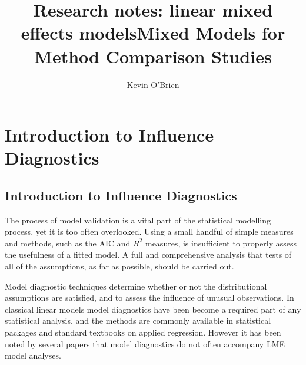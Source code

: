 \documentclass[12pt, a4paper]{report}
\title{Research notes: linear mixed effects models}
\author{ } \date{ }
\theoremstyle{plain}
\theoremstyle{definition}
\theoremstyle{remark}
\begin{document}
	\author{Kevin O'Brien}
	\title{Mixed Models for Method Comparison Studies}
	
	
	
	
	
	\chapter{Introduction to Influence Diagnostics}
	
	\section{Introduction to Influence Diagnostics}
	The process of model validation is a vital part of the statistical modelling process, yet it is too often overlooked. Using a small handful of simple measures and methods, such as the AIC and $R^2$ measures, is insufficient to properly assess the usefulness of a fitted model. A full and comprehensive
	analysis that tests of all of the assumptions, as far as possible, should be carried out. 
	
	Model diagnostic techniques determine whether or not the distributional assumptions are satisfied, and to assess the influence of unusual observations. In classical linear models model diagnostics have been become a required part of any statistical analysis, and the methods are commonly available in statistical packages and standard textbooks on applied regression. However it has been noted by several papers that model diagnostics do not often accompany LME model analyses.
	
\end{document}
